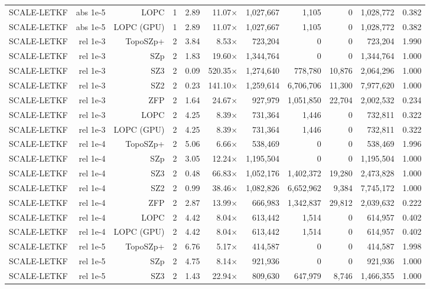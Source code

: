 \begin{tabular}{lrrrrrrrrrr}
SCALE-LETKF & abs 1e-5 & LOPC & 1 & 2.89 & 11.07$\times$ & 1,027,667 & 1,105 & 0 & 1,028,772 & 0.382 \\
SCALE-LETKF & abs 1e-5 & LOPC (GPU) & 1 & 2.89 & 11.07$\times$ & 1,027,667 & 1,105 & 0 & 1,028,772 & 0.382 \\
SCALE-LETKF & rel 1e-3 & TopoSZp+ & 2 & 3.84 & 8.53$\times$ & 723,204 & 0 & 0 & 723,204 & 1.990 \\
SCALE-LETKF & rel 1e-3 & SZp & 2 & 1.83 & 19.60$\times$ & 1,344,764 & 0 & 0 & 1,344,764 & 1.000 \\
SCALE-LETKF & rel 1e-3 & SZ3 & 2 & 0.09 & 520.35$\times$ & 1,274,640 & 778,780 & 10,876 & 2,064,296 & 1.000 \\
SCALE-LETKF & rel 1e-3 & SZ2 & 2 & 0.23 & 141.10$\times$ & 1,259,614 & 6,706,706 & 11,300 & 7,977,620 & 1.000 \\
SCALE-LETKF & rel 1e-3 & ZFP & 2 & 1.64 & 24.67$\times$ & 927,979 & 1,051,850 & 22,704 & 2,002,532 & 0.234 \\
SCALE-LETKF & rel 1e-3 & LOPC & 2 & 4.25 & 8.39$\times$ & 731,364 & 1,446 & 0 & 732,811 & 0.322 \\
SCALE-LETKF & rel 1e-3 & LOPC (GPU) & 2 & 4.25 & 8.39$\times$ & 731,364 & 1,446 & 0 & 732,811 & 0.322 \\
SCALE-LETKF & rel 1e-4 & TopoSZp+ & 2 & 5.06 & 6.66$\times$ & 538,469 & 0 & 0 & 538,469 & 1.996 \\
SCALE-LETKF & rel 1e-4 & SZp & 2 & 3.05 & 12.24$\times$ & 1,195,504 & 0 & 0 & 1,195,504 & 1.000 \\
SCALE-LETKF & rel 1e-4 & SZ3 & 2 & 0.48 & 66.83$\times$ & 1,052,176 & 1,402,372 & 19,280 & 2,473,828 & 1.000 \\
SCALE-LETKF & rel 1e-4 & SZ2 & 2 & 0.99 & 38.46$\times$ & 1,082,826 & 6,652,962 & 9,384 & 7,745,172 & 1.000 \\
SCALE-LETKF & rel 1e-4 & ZFP & 2 & 2.87 & 13.99$\times$ & 666,983 & 1,342,837 & 29,812 & 2,039,632 & 0.222 \\
SCALE-LETKF & rel 1e-4 & LOPC & 2 & 4.42 & 8.04$\times$ & 613,442 & 1,514 & 0 & 614,957 & 0.402 \\
SCALE-LETKF & rel 1e-4 & LOPC (GPU) & 2 & 4.42 & 8.04$\times$ & 613,442 & 1,514 & 0 & 614,957 & 0.402 \\
SCALE-LETKF & rel 1e-5 & TopoSZp+ & 2 & 6.76 & 5.17$\times$ & 414,587 & 0 & 0 & 414,587 & 1.998 \\
SCALE-LETKF & rel 1e-5 & SZp & 2 & 4.75 & 8.14$\times$ & 921,936 & 0 & 0 & 921,936 & 1.000 \\
SCALE-LETKF & rel 1e-5 & SZ3 & 2 & 1.43 & 22.94$\times$ & 809,630 & 647,979 & 8,746 & 1,466,355 & 1.000 \\

\end{tabular}
